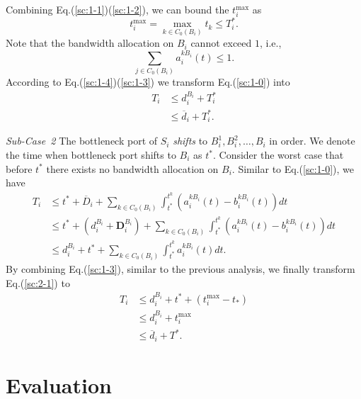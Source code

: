 \documentclass[10pt, conference, letterpaper]{IEEEtran}
\begin{document}
\begin{IEEEproof}
Combining Eq.(\ref{sc:1-1})(\ref{sc:1-2}), we can bound the $t_i^{\text{max}}$ as
\begin{equation}\label{sc:1-4}
	t_i^{\text{max}} = \max_{k \in C_0(B_i)} t_k \leq T_i^*.
\end{equation}
Note that the bandwidth allocation on $B_i$ cannot exceed $1$, i.e.,
\begin{equation}\label{sc:1-3}
	\sum_{j \in C_0(B_i)} a_i^{kB_i}(t) \leq 1.
\end{equation}
According to Eq.(\ref{sc:1-4})(\ref{sc:1-3}) we transform Eq.(\ref{sc:1-0}) into
\begin{equation}
	\begin{aligned}
		T_i & \leq d_i^{B_i} + T_i^*\\
		& \leq \overline{d}_i + T_i^*.
	\end{aligned}
\end{equation}

\emph{Sub-Case~2} The bottleneck port of $S_i$ \emph{shifts} to $B_i^1,B_i^2,\dots,B_i$ in order. We denote the time when bottleneck port shifts to $B_i$ as $t^*$. Consider the worst case that before $t^*$ there exists no bandwidth allocation on $B_i$. Similar to Eq.(\ref{sc:1-0}), we have
\begin{equation}\label{sc:2-1}
	\begin{aligned}
		T_i & \leq t^* + \overline{D}_i + \sum_{k \in C_0(B_i)}\int_{t^*}^{t^k}(a_i^{kB_i}(t)-b_i^{kB_i}(t))dt\\
		& \leq t^* + (d_i^{B_i} + \mathbf{D}_i^{B_i}) + \sum_{k \in C_0(B_i)}\int_{t^*}^{t^k}(a_i^{kB_i}(t)-b_i^{kB_i}(t))dt\\
		& \leq d_i^{B_i} + t^* + \sum_{k \in C_0(B_i)}\int_{t^*}^{t^k} a_i^{kB_i}(t)dt.
	\end{aligned}
\end{equation}
By combining Eq.(\ref{sc:1-3}), similar to the previous analysis, we finally transform Eq.(\ref{sc:2-1}) to
\begin{equation}
	\begin{aligned}
		T_i & \leq d_i^{B_i} + t^* + (t_i^{\text{max}} - t_*)\\
		& \leq d_i^{B_i} + t_i^{\text{max}}\\
		& \leq \overline{d}_i + T^*.
	\end{aligned}
\end{equation}
\end{IEEEproof}

\section{Evaluation}
\end{document}
